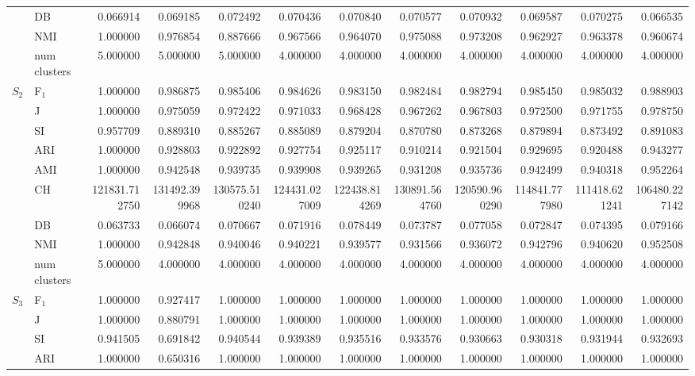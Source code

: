 \begin{tabular}{llrrrrrrrrrr}
 & DB & 0.066914 & 0.069185 & 0.072492 & 0.070436 & 0.070840 & 0.070577 & 0.070932 & 0.069587 & 0.070275 & 0.066535 \\
 & NMI & 1.000000 & 0.976854 & 0.887666 & 0.967566 & 0.964070 & 0.975088 & 0.973208 & 0.962927 & 0.963378 & 0.960674 \\
 & num clusters & 5.000000 & 5.000000 & 5.000000 & 4.000000 & 4.000000 & 4.000000 & 4.000000 & 4.000000 & 4.000000 & 4.000000 \\
\multirow[c]{9}{*}{$S_{2}$} & F$_1$ & 1.000000 & 0.986875 & 0.985406 & 0.984626 & 0.983150 & 0.982484 & 0.982794 & 0.985450 & 0.985032 & 0.988903 \\
 & J & 1.000000 & 0.975059 & 0.972422 & 0.971033 & 0.968428 & 0.967262 & 0.967803 & 0.972500 & 0.971755 & 0.978750 \\
 & SI & 0.957709 & 0.889310 & 0.885267 & 0.885089 & 0.879204 & 0.870780 & 0.873268 & 0.879894 & 0.873492 & 0.891083 \\
 & ARI & 1.000000 & 0.928803 & 0.922892 & 0.927754 & 0.925117 & 0.910214 & 0.921504 & 0.929695 & 0.920488 & 0.943277 \\
 & AMI & 1.000000 & 0.942548 & 0.939735 & 0.939908 & 0.939265 & 0.931208 & 0.935736 & 0.942499 & 0.940318 & 0.952264 \\
 & CH & 121831.712750 & 131492.399968 & 130575.510240 & 124431.027009 & 122438.814269 & 130891.564760 & 120590.960290 & 114841.777980 & 111418.621241 & 106480.227142 \\
 & DB & 0.063733 & 0.066074 & 0.070667 & 0.071916 & 0.078449 & 0.073787 & 0.077058 & 0.072847 & 0.074395 & 0.079166 \\
 & NMI & 1.000000 & 0.942848 & 0.940046 & 0.940221 & 0.939577 & 0.931566 & 0.936072 & 0.942796 & 0.940620 & 0.952508 \\
 & num clusters & 5.000000 & 4.000000 & 4.000000 & 4.000000 & 4.000000 & 4.000000 & 4.000000 & 4.000000 & 4.000000 & 4.000000 \\
\multirow[c]{9}{*}{$S_{3}$} & F$_1$ & 1.000000 & 0.927417 & 1.000000 & 1.000000 & 1.000000 & 1.000000 & 1.000000 & 1.000000 & 1.000000 & 1.000000 \\
 & J & 1.000000 & 0.880791 & 1.000000 & 1.000000 & 1.000000 & 1.000000 & 1.000000 & 1.000000 & 1.000000 & 1.000000 \\
 & SI & 0.941505 & 0.691842 & 0.940544 & 0.939389 & 0.935516 & 0.933576 & 0.930663 & 0.930318 & 0.931944 & 0.932693 \\
 & ARI & 1.000000 & 0.650316 & 1.000000 & 1.000000 & 1.000000 & 1.000000 & 1.000000 & 1.000000 & 1.000000 & 1.000000 \\

\end{tabular}
